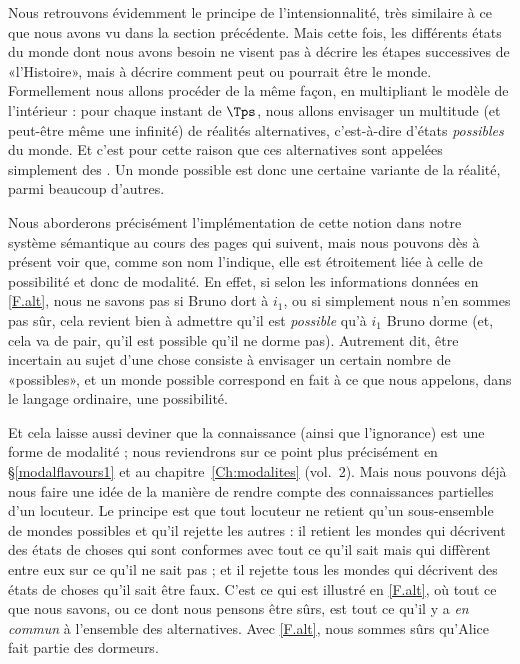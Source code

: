 Nous retrouvons évidemment le principe de l'intensionnalité, très similaire à ce que nous avons vu dans la section précédente. 
Mais cette fois, les différents états du monde dont nous avons besoin ne visent pas à décrire les étapes successives de «l'Histoire», mais à décrire 
comment peut ou pourrait être le monde. 
Formellement nous allons procéder de la même façon, en multipliant le modèle de l'intérieur : pour chaque instant de $\Tps$, nous allons envisager un multitude (et peut-être même une infinité) de réalités alternatives, c'est-à-dire d'états \emph{possibles} du monde. 
Et c'est pour cette raison que ces alternatives sont appelées simplement des . Un monde possible est donc une certaine variante de la réalité, parmi beaucoup d'autres. 

Nous aborderons précisément l'implémentation de cette notion dans notre système sémantique au cours des pages qui suivent, mais nous pouvons dès à présent voir que, comme son nom l'indique, elle est étroitement liée à celle de possibilité et donc de modalité.  
En effet, si selon les informations données en \ref{F.alt}, nous ne savons pas si Bruno dort à $i_1$, ou si
simplement nous n'en sommes pas sûr, cela revient bien à admettre
qu'il est \emph{possible} qu'à $i_1$ Bruno dorme (et, cela va de pair,
qu'il est possible qu'il ne dorme pas). Autrement dit, être incertain
au sujet d'une chose consiste à envisager un certain nombre de
«possibles», et un monde possible correspond en fait à ce que nous appelons, dans le langage ordinaire, une possibilité. 

Et cela laisse aussi deviner que la connaissance (ainsi que l'ignorance) est une forme de modalité ; nous reviendrons sur ce point plus précisément en \S\ref{modalflavours1} et au chapitre~\ref{Ch:modalites} (vol.~2).  
Mais nous pouvons déjà nous faire une idée de la manière de rendre compte des connaissances partielles d'un locuteur. Le principe est que tout locuteur ne retient qu'un sous-ensemble de mondes possibles et qu'il rejette les autres : il retient les mondes qui décrivent des états de choses qui sont conformes avec tout ce qu'il sait mais qui diffèrent entre eux sur ce qu'il ne sait pas ; et il rejette tous les mondes qui décrivent des états de choses qu'il sait être faux. C'est ce qui est illustré en \ref{F.alt}, où tout ce que nous savons, ou ce dont nous pensons être sûrs, est tout ce qu'il y a
\emph{en commun} à l'ensemble des alternatives.  Avec \ref{F.alt}, nous sommes
sûrs qu'Alice fait partie des dormeurs.




